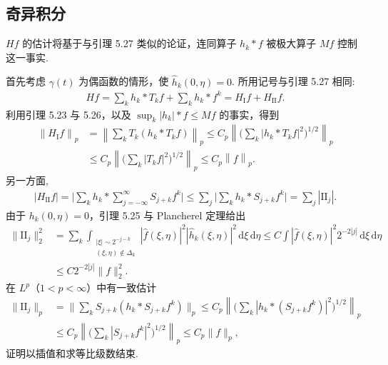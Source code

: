 \subsection{奇异积分}

$Hf$ 的估计将基于与引理 5.27 类似的论证，连同算子 $h_k * f$ 被极大算子 $Mf$ 控制这一事实.

首先考虑 $\gamma(t)$ 为偶函数的情形，使 $\widehat{h}_{k}(0,\eta)=0$. 所用记号与引理 5.27 相同:
\begin{align*}
  H f=\sum_{k}h_{k}*T_{k}f+\sum_{k}h_{k}*f^{k}=H_{\mathrm{I}}f+H_{\mathrm{II}}f.
\end{align*}
利用引理 5.23 与 5.26，以及 $\sup_k |h_k| * f \leq M f$ 的事实，得到
\begin{align*}
  \left\|H_{\mathrm{I}}f\right\|_{p}
  &=\left\|\sum_{k}T_{k}(h_{k}*T_{k}f)\right\|_{p}
  \leq C_{p}\left\|\Big(\sum_{k}|h_{k}*T_{k}f|^{2}\Big)^{1/2}\right\|_{p}\\
  &\leq C_{p}\left\|\Big(\sum_{k}|T_{k}f|^{2}\Big)^{1/2}\right\|_{p}
  \leq C_{p}\left\|f\right\|_{p}.
\end{align*}
另一方面,
\begin{align*}
  |H_{\mathrm{II}}f|=\Big|\sum_{k}h_{k}*\sum_{j=-\infty}^{\infty}S_{j+k}f^{k}\Big|
  \leq\sum_{j}\Big|\sum_{k}h_{k}*S_{j+k}f^{k}\Big|
  =\sum_{j}|\mathrm{II}_{j}|.
\end{align*}
由于 $h_{k}(0,\eta)=0$，引理 5.25 与 Plancherel 定理给出
\begin{align*}
  \|\mathrm{II}_{j}\|_{2}^{2}
  &=\sum_{k}\int_{\substack{|\xi|\sim 2^{-j-k}\\ (\xi,\eta)\notin\Delta_{k}}}
   |\widehat{f}(\xi,\eta)|^{2}|\widehat{h}_{k}(\xi,\eta)|^{2}\,\mathrm{d}\xi\,\mathrm{d}\eta
  \leq C\int|\widehat{f}(\xi,\eta)|^{2}2^{-2|j|}\,\mathrm{d}\xi\,\mathrm{d}\eta\\
  &\leq C2^{-2|j|}\|f\|_{2}^{2}.
\end{align*}
在 $L^{p}$（$1 < p < \infty$）中有一致估计
\begin{align*}
  \|\mathrm{II}_{j}\|_{p}
  &=\Big\|\sum_{k}S_{j+k}(h_{k}*S_{j+k}f^{k})\Big\|_{p}
  \leq C_{p}\left\|\Big(\sum_{k}|h_{k}*(S_{j+k}f^{k})|^{2}\Big)^{1/2}\right\|_{p}\\
  &\leq C_{p}\left\|\Big(\sum_{k}|S_{j+k}f^{k}|^{2}\Big)^{1/2}\right\|_{p}
  \leq C_{p}\|f\|_{p},
\end{align*}
证明以插值和求等比级数结束.

